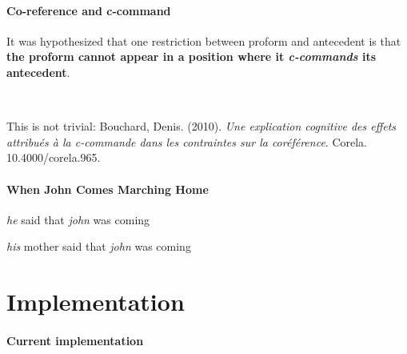 \documentclass[a4paper]{article}
\begin{document}
\paragraph{Co-reference and c-command}

It was hypothesized that one restriction between proform and antecedent is that {\bfseries the proform cannot appear in a position where it \emph{c-commands} its antecedent}.

~\par

This is not trivial: Bouchard, Denis. (2010). \textit{Une explication cognitive des effets attribués à la c-commande dans les contraintes sur la coréférence}. Corela. 10.4000/corela.965.

\paragraph{When John Comes Marching Home}

\emph{he} said that \emph{john} was coming

\begin{figure}
\centering
{}
\end{figure}

\emph{his} mother said that \emph{john} was coming

\begin{center}
\end{center}

\section{Implementation}

\paragraph{Current implementation}
\end{document}
